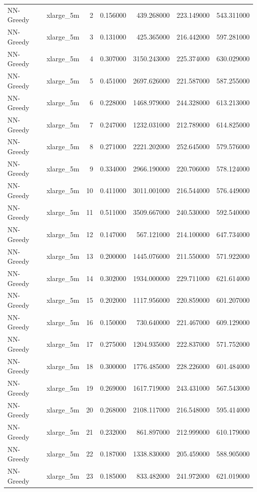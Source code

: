 \begin{tabular}{llrrrrr}
NN-Greedy & xlarge_5m & 2 & 0.156000 & 439.268000 & 223.149000 & 543.311000 \\
NN-Greedy & xlarge_5m & 3 & 0.131000 & 425.365000 & 216.442000 & 597.281000 \\
NN-Greedy & xlarge_5m & 4 & 0.307000 & 3150.243000 & 225.374000 & 630.029000 \\
NN-Greedy & xlarge_5m & 5 & 0.451000 & 2697.626000 & 221.587000 & 587.255000 \\
NN-Greedy & xlarge_5m & 6 & 0.228000 & 1468.979000 & 244.328000 & 613.213000 \\
NN-Greedy & xlarge_5m & 7 & 0.247000 & 1232.031000 & 212.789000 & 614.825000 \\
NN-Greedy & xlarge_5m & 8 & 0.271000 & 2221.202000 & 252.645000 & 579.576000 \\
NN-Greedy & xlarge_5m & 9 & 0.334000 & 2966.190000 & 220.706000 & 578.124000 \\
NN-Greedy & xlarge_5m & 10 & 0.411000 & 3011.001000 & 216.544000 & 576.449000 \\
NN-Greedy & xlarge_5m & 11 & 0.511000 & 3509.667000 & 240.530000 & 592.540000 \\
NN-Greedy & xlarge_5m & 12 & 0.147000 & 567.121000 & 214.100000 & 647.734000 \\
NN-Greedy & xlarge_5m & 13 & 0.200000 & 1445.076000 & 211.550000 & 571.922000 \\
NN-Greedy & xlarge_5m & 14 & 0.302000 & 1934.000000 & 229.711000 & 621.614000 \\
NN-Greedy & xlarge_5m & 15 & 0.202000 & 1117.956000 & 220.859000 & 601.207000 \\
NN-Greedy & xlarge_5m & 16 & 0.150000 & 730.640000 & 221.467000 & 609.129000 \\
NN-Greedy & xlarge_5m & 17 & 0.275000 & 1204.935000 & 222.837000 & 571.752000 \\
NN-Greedy & xlarge_5m & 18 & 0.300000 & 1776.485000 & 228.226000 & 601.484000 \\
NN-Greedy & xlarge_5m & 19 & 0.269000 & 1617.719000 & 243.431000 & 567.543000 \\
NN-Greedy & xlarge_5m & 20 & 0.268000 & 2108.117000 & 216.548000 & 595.414000 \\
NN-Greedy & xlarge_5m & 21 & 0.232000 & 861.897000 & 212.999000 & 610.179000 \\
NN-Greedy & xlarge_5m & 22 & 0.187000 & 1338.830000 & 205.459000 & 588.905000 \\
NN-Greedy & xlarge_5m & 23 & 0.185000 & 833.482000 & 241.972000 & 621.019000 \\

\end{tabular}

